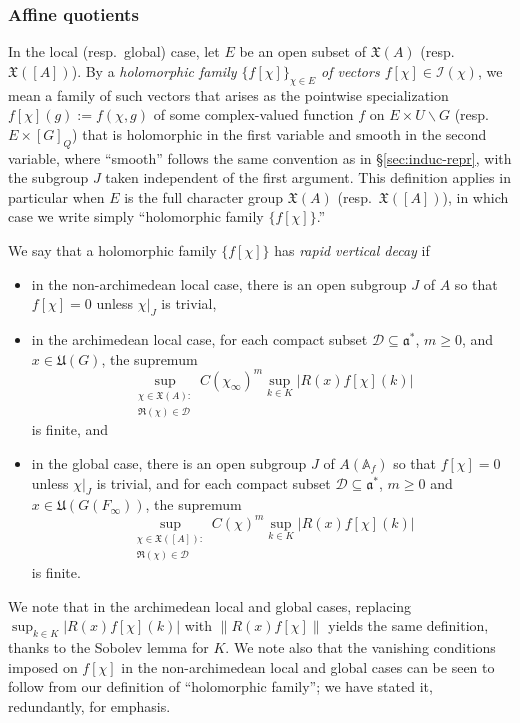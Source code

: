 \subsubsection{Affine quotients}\label{sec:mellin-paley-affine-quotients}
In the local (resp.\ global) case, let $E$ be an open subset of $\mathfrak{X}(A)$ (resp.\ $\mathfrak{X}([A])$).  By a \emph{holomorphic family $\{f[\chi]\}_{\chi \in E}$ of vectors $f[\chi] \in \mathcal{I}(\chi)$}, we mean a family of such vectors that arises as the pointwise specialization $f[\chi](g) := f(\chi,g)$ of some complex-valued function $f$ on $E \times U \backslash G$ (resp.\ $E \times [G]_Q$) that is holomorphic in the first variable and smooth in the second variable, where ``smooth'' follows the same convention as in \S\ref{sec:induc-repr}, with the subgroup $J$ taken independent of the first argument.  This definition applies in particular when $E$ is the full character group $\mathfrak{X}(A)$ (resp.\ $\mathfrak{X}([A])$), in which case we write simply ``holomorphic family $\{f[\chi]\}$.''

We say that a holomorphic family $\{f[\chi]\}$ has \emph{rapid vertical decay} if
\begin{itemize}
\item in the non-archimedean local case, there is an open subgroup $J$ of $A$ so that $f[\chi] = 0$ unless $\chi|_J$ is trivial,
\item in the archimedean local case, for each compact subset $\mathcal{D} \subseteq \mathfrak{a}^*$, $m \geq 0$, and $x \in \mathfrak{U}(G)$, the supremum
  \begin{equation}\label{eq:sup_chi-in-mathfr-1}
    \sup_{
      \substack{
        \chi \in \mathfrak{X}(A) :  \\
        \Re(\chi) \in \mathcal{D}
      }
    } C(\chi_\infty)^m \sup_{k \in K} |R(x) f[\chi](k)|
  \end{equation}
  is finite, and
\item in the global case, there is an open subgroup $J$ of $A(\mathbb{A}_f)$ so that $f[\chi] = 0$ unless $\chi|_J$ is trivial, and for each compact subset $\mathcal{D} \subseteq \mathfrak{a}^*$, $m \geq 0$ and $x \in \mathfrak{U}(G(F_\infty))$, the supremum
  \begin{equation}\label{eq:sup_-substack-chi}
    \sup_{
      \substack{
        \chi \in \mathfrak{X}([A]) :  \\
        \Re(\chi) \in \mathcal{D}
      }
    }  C(\chi)^m \sup_{k \in K} |R(x) f[\chi](k)|
  \end{equation}
  is finite.
\end{itemize}
We note that in the archimedean local and global cases, replacing $\sup_{k \in K} |R(x) f[\chi](k)|$ with $\|R(x) f[\chi] \|$ yields the same definition, thanks to the Sobolev lemma for $K$.  We note also that the vanishing conditions imposed on $f[\chi]$ in the non-archimedean local and global cases can be seen to follow from our definition of ``holomorphic family''; we have stated it, redundantly, for emphasis.

